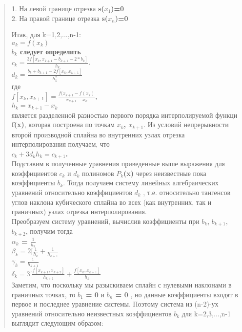 \documentclass{article}
\begin{document}
\begin{quotation}
1. На левой границе отрезка \textbf{s($x_1$)=0}\\
 
2. На правой границе отрезка \textbf{s($x_n$)=0}\\
\newpage

Итак, для k=1,2,...,n-1:\\
\textbf{$a_k=f(x_k)$}\\
\textbf{$b_k$ следует определить}\\
\textbf{$c_k=\frac{3f[x_k,x_{k+1}-b_{k+1}-2*b_k]}{h_k}$}.\\
\textbf{$d_k=\frac{b_k+b_{k+1}-2f[x_k,x_{k+1}]}{h_k^2}$}\\

где\\


\textbf{$f[x_k,x_{k+1}]=\frac{f(x_{k+1}-f(x_k)}{x_{k+1}-x_k},$}\\   
$h_k=x_{k+1}-x_k$\\

является разделенной разностью первого порядка интерполируемой функци \textbf{f(x)}, которая построена по точкам \textbf{$x_k$, $x_{k+1}$}.
Из условий непрерывности второй производной сплайна во внутренних узлах отрезка интерполирования получаем, что\\
\textbf{$c_k+3d_kh_k=c_{k+1}$.}\\
 
	Подставим в полученные уравнения приведенные выше выражения для коэффициентов \textbf{$c_k$} и \textbf{$d_k$} полиномов \textbf{$P_k$(x)} через неизвестные пока коэффициенты \textbf{$b_k$}. Тогда получаем систему линейных алгебраических уравнений относительно коэффициентов \textbf{$d_k$} , т.е. относительно тангенсов углов наклона кубического сплайна во всех (как внутренних, так и граничных) узлах отрезка интерполирования.\\
	
	Преобразуем систему уравнений, вычислив коэффициенты при \textbf{$b_k$}, \textbf{$b_{k+1}$}, \textbf{$b_{k+2}$}, получим тогда\\
	
	
\textbf{$\alpha_k$ = $\frac{1}{h_k}$}\\
\textbf{$\beta_k = 2[\frac{1}{h_k}+\frac{1}{h_{k+1}}$}\\
\textbf{$\gamma_k = \frac{1}{h_{k+1}}$}\\
\textbf{$\delta_k = 3[\frac{f[x_{k+1},x_{k+2}]}{h_{k+1}}+\frac{f[x_k,x_{k+1}]}{h_k}$}\\

	Заметим, что поскольку мы разыскиваем сплайн с нулевыми наклонами в граничных точках, то \textbf{$b_1$ = 0} и \textbf{$b_n$ = 0} , но данные коэффициенты входят в первое и последнее уравнение системы. Поэтому система из (n-2)-ух уравнений относительно неизвестных коэффициентов \textbf{$b_k$} для k=2,3,...,n-1 выглядит следующим образом:\\
	

\end{quotation}
\end{document}
